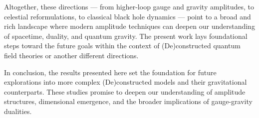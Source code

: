 \documentclass[12pt]{article}
\numberwithin{equation}{section}
\begin{document}
Altogether, these directions — from higher-loop gauge and gravity amplitudes, to celestial reformulations, to classical black hole dynamics — point to a broad and rich landscape where modern amplitude techniques can deepen our understanding of spacetime, duality, and quantum gravity. The present work lays foundational steps toward the future goals within the context of (De)constructed quantum field theories or another different directions. 

In conclusion, the results presented here set the foundation for future explorations into more complex (De)constructed models and their gravitational counterparts. These studies promise to deepen our understanding of amplitude structures, dimensional emergence, and the broader implications of gauge-gravity dualities.





\end{document}
